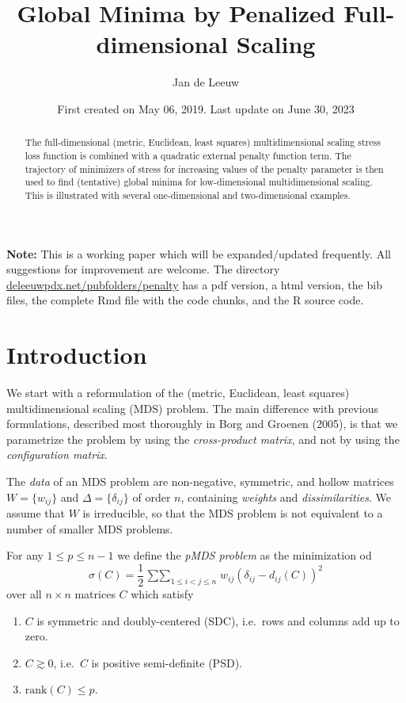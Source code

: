\documentclass[
  12pt,
]{article}
\title{Global Minima by Penalized Full-dimensional Scaling}
\author{Jan de Leeuw}
\date{First created on May 06, 2019. Last update on June 30, 2023}
\providecommand{\tightlist}{%
  \setlength{\itemsep}{0pt}\setlength{\parskip}{0pt}}
\begin{document}
\maketitle
\begin{abstract}
The full-dimensional (metric, Euclidean, least squares) multidimensional
scaling stress loss function is combined with a quadratic external
penalty function term. The trajectory of minimizers of stress for
increasing values of the penalty parameter is then used to find
(tentative) global minima for low-dimensional multidimensional scaling.
This is illustrated with several one-dimensional and two-dimensional
examples.
\end{abstract}

{
\setcounter{tocdepth}{3}
\tableofcontents
}
\textbf{Note:} This is a working paper which will be expanded/updated
frequently. All suggestions for improvement are welcome. The directory
\href{http://deleeuwpdx.net/pubfolders/penalty}{deleeuwpdx.net/pubfolders/penalty}
has a pdf version, a html version, the bib files, the complete Rmd file
with the code chunks, and the R source code.

\hypertarget{introduction}{%
\section{Introduction}\label{introduction}}

We start with a reformulation of the (metric, Euclidean, least squares)
multidimensional scaling (MDS) problem. The main difference with
previous formulations, described most thoroughly in Borg and Groenen
(2005), is that we parametrize the problem by using the
\emph{cross-product matrix}, and not by using the \emph{configuration
matrix}.

The \emph{data} of an MDS problem are non-negative, symmetric, and
hollow matrices \(W=\{w_{ij}\}\) and \(\Delta=\{\delta_{ij}\}\) of order
\(n\), containing \emph{weights} and \emph{dissimilarities}. We assume
that \(W\) is irreducible, so that the MDS problem is not equivalent to
a number of smaller MDS problems.

For any \(1\leq p\leq n-1\) we define the \emph{pMDS problem} as the
minimization od \begin{equation}\label{E:stress}
\sigma(C)=\frac12\mathop{\sum\sum}_{1\leq i<j\leq n}w_{ij}(\delta_{ij}-d_{ij}(C))^2
\end{equation} over all \(n\times n\) matrices \(C\) which satisfy

\begin{enumerate}
\def\labelenumi{\arabic{enumi}.}
\tightlist
\item
  \(C\) is symmetric and doubly-centered (SDC), i.e.~rows and columns
  add up to zero.
\item
  \(C\gtrsim 0\), i.e.~\(C\) is positive semi-definite (PSD).
\item
  \(\text{rank}(C)\leq p\).
\end{enumerate}
\end{document}
